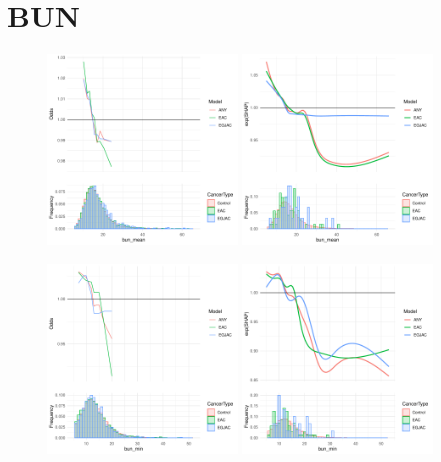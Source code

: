 \documentclass[12pt]{article}
\begin{document}
\newpage
\clearpage
\section{BUN}

\begin{figure}[h]
\centering
\includegraphics[width=0.45\textwidth]{pdp/bun_mean.pdf}
\includegraphics[width=0.45\textwidth]{shap/bun_mean.pdf}
\end{figure}
\begin{figure}[h]
\centering
\includegraphics[width=0.45\textwidth]{pdp/bun_min.pdf}
\includegraphics[width=0.45\textwidth]{shap/bun_min.pdf}
\end{figure}
\end{document}
